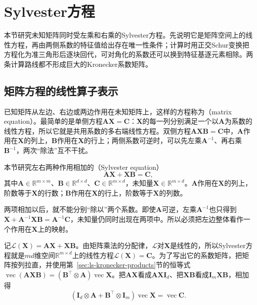 
\section{Sylvester方程}
\label{sec:ls-matrix-equations}

本节研究未知矩阵同时受左乘和右乘的Sylvester方程。先说明它是矩阵空间上的线性方程，再由两侧系数的特征值给出存在唯一性条件；计算时用正交Schur变换把方程化为准三角形后逐块回代，可对角化的系数还可以换到特征基逐元素相除。两条计算路线都不形成巨大的Kronecker系数矩阵。

\subsection{矩阵方程的线性算子表示}
\label{sec:ls-matrix-equation-types}

已知矩阵从左边、右边或两边作用在未知矩阵上，这样的方程称为（matrix equation）。最简单的是单侧方程$\bm A\bm X=\bm C$：$\bm X$的每一列分别满足一个以$\bm A$为系数的线性方程，所以它就是共用系数的多右端线性方程。双侧方程$\bm A\bm X\bm B=\bm C$中，$\bm A$作用在$\bm X$的列上，$\bm B$作用在$\bm X$的行上；两侧系数可逆时，可以先左乘$\bm A^{-1}$、再右乘$\bm B^{-1}$，两次“除法”互不干扰。

本节研究左右两种作用相加的（Sylvester equation）
\[
 \bm A\bm X+\bm X\bm B=\bm C,
\]
其中$\bm A\in\mathbb R^{m\times m}$、$\bm B\in\mathbb R^{d\times d}$、$\bm C\in\mathbb R^{m\times d}$，未知量$\bm X\in\mathbb R^{m\times d}$。$\bm A$作用在$\bm X$的列上，阶数等于$\bm X$的行数；$\bm B$作用在$\bm X$的行上，阶数等于$\bm X$的列数。

两项相加以后，就不能分别“除以”两个系数。即使$\bm A$可逆，左乘$\bm A^{-1}$也只得到$\bm X+\bm A^{-1}\bm X\bm B=\bm A^{-1}\bm C$，未知量仍同时出现在两项中。所以必须把左边整体看作一个作用在$\bm X$上的映射。

记$\mathcal L(\bm X)=\bm A\bm X+\bm X\bm B$。由矩阵乘法的分配律，$\mathcal L$对$\bm X$是线性的，所以Sylvester方程就是$md$维空间$\mathbb R^{m\times d}$上的线性方程$\mathcal L(\bm X)=\bm C$。为了写出它的系数矩阵，把矩阵按列拉直，并使用第~\ref{sec:ls-kronecker-products}节的恒等式$\operatorname{vec}(\bm A\bm X\bm B)=(\bm B^\top\otimes\bm A)\operatorname{vec}\bm X$。把$\bm A\bm X$看成$\bm A\bm X\bm I_d$、把$\bm X\bm B$看成$\bm I_m\bm X\bm B$，相加得
\begin{equation}
 (\bm I_d\otimes\bm A+\bm B^\top\otimes\bm I_m)\operatorname{vec}\bm X
 =\operatorname{vec}\bm C .
 \label{eq:ls-sylvester-vectorized}
\end{equation}

